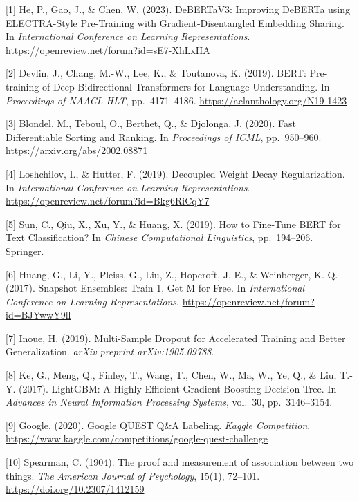 \documentclass{article}
\begin{document}
{\small

[1] He, P., Gao, J., \& Chen, W. (2023). DeBERTaV3: Improving DeBERTa using ELECTRA-Style Pre-Training with Gradient-Disentangled Embedding Sharing. In {\it International Conference on Learning Representations}. \url{https://openreview.net/forum?id=sE7-XhLxHA}

[2] Devlin, J., Chang, M.-W., Lee, K., \& Toutanova, K. (2019). BERT: Pre-training of Deep Bidirectional Transformers for Language Understanding. In {\it Proceedings of NAACL-HLT}, pp.\ 4171--4186. \url{https://aclanthology.org/N19-1423}

[3] Blondel, M., Teboul, O., Berthet, Q., \& Djolonga, J. (2020). Fast Differentiable Sorting and Ranking. In {\it Proceedings of ICML}, pp.\ 950--960. \url{https://arxiv.org/abs/2002.08871}

[4] Loshchilov, I., \& Hutter, F. (2019). Decoupled Weight Decay Regularization. In {\it International Conference on Learning Representations}. \url{https://openreview.net/forum?id=Bkg6RiCqY7}

[5] Sun, C., Qiu, X., Xu, Y., \& Huang, X. (2019). How to Fine-Tune BERT for Text Classification? In {\it Chinese Computational Linguistics}, pp.\ 194--206. Springer.

[6] Huang, G., Li, Y., Pleiss, G., Liu, Z., Hopcroft, J. E., \& Weinberger, K. Q. (2017). Snapshot Ensembles: Train 1, Get M for Free. In {\it International Conference on Learning Representations}. \url{https://openreview.net/forum?id=BJYwwY9ll}

[7] Inoue, H. (2019). Multi-Sample Dropout for Accelerated Training and Better Generalization. {\it arXiv preprint arXiv:1905.09788}.

[8] Ke, G., Meng, Q., Finley, T., Wang, T., Chen, W., Ma, W., Ye, Q., \& Liu, T.-Y. (2017). LightGBM: A Highly Efficient Gradient Boosting Decision Tree. In {\it Advances in Neural Information Processing Systems}, vol.\ 30, pp.\ 3146--3154.

[9] Google. (2020). Google QUEST Q\&A Labeling. {\it Kaggle Competition}. \url{https://www.kaggle.com/competitions/google-quest-challenge}

[10] Spearman, C. (1904). The proof and measurement of association between two things. {\it The American Journal of Psychology}, 15(1), 72--101. \url{https://doi.org/10.2307/1412159}
}

\end{document}
